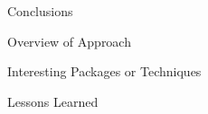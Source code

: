 \documentclass[ignorenonframetext,]{beamer}
\begin{document}
\begin{frame}{Conclusions}
\protect\hypertarget{conclusions}{}

\end{frame}

\begin{frame}{Overview of Approach}
\protect\hypertarget{overview-of-approach}{}

\end{frame}

\begin{frame}{Interesting Packages or Techniques}
\protect\hypertarget{interesting-packages-or-techniques}{}

\end{frame}

\begin{frame}{Lessons Learned}
\protect\hypertarget{lessons-learned}{}

\end{frame}
\end{document}
